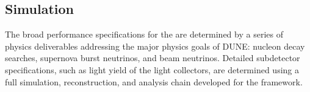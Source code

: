 %
\subsection{Simulation}
\label{sec:fdsp-pd-simphys}


The broad performance specifications for the  are determined by a series of physics deliverables addressing the major physics goals of DUNE: nucleon decay searches, supernova burst neutrinos, and beam neutrinos. Detailed subdetector specifications, such as light yield of the light collectors, are determined using a full simulation, reconstruction, and analysis chain developed for the \larsoft framework. 


